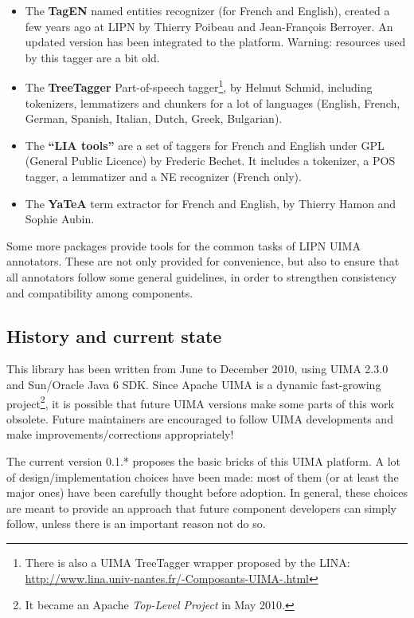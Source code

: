 \documentclass{article}
\newenvironment{xitemize}{
\begin{itemize}
  \setlength{\itemsep}{.3\baselineskip}
  \setlength{\topsep}{0pt}
  \setlength{\parskip}{0pt}
  \setlength{\parsep}{0pt}
}{\end{itemize}}
\begin{document}
\begin{xitemize}
\item The {\bf TagEN} named entities recognizer (for French and English), created a few years ago at LIPN by Thierry Poibeau and Jean-François Berroyer. An updated version has been integrated to the platform. Warning: resources used by this tagger are a bit old.
\item The {\bf TreeTagger} Part-of-speech tagger\footnote{There is also a UIMA TreeTagger wrapper proposed by the LINA: \url{http://www.lina.univ-nantes.fr/-Composants-UIMA-.html}}, by Helmut Schmid, including tokenizers, lemmatizers and chunkers for a lot of languages (English, French, German, Spanish, Italian, Dutch, Greek, Bulgarian).  
\item The {\bf ``LIA tools''} are a set of taggers for French and English under GPL (General Public Licence) by Frederic Bechet. It includes a tokenizer, a POS tagger, a lemmatizer and a NE recognizer (French only). 
\item The {\bf YaTeA} term extractor for French and English, by Thierry Hamon and Sophie Aubin.

\end{xitemize}

Some more packages provide tools for the common tasks of LIPN UIMA annotators. These are not only provided for convenience, but also to ensure that all annotators follow some general guidelines, in order to strengthen consistency and compatibility among components.



\subsection{History and current state}

This library has been written from June to December 2010, using UIMA 2.3.0 and Sun/Oracle Java 6 SDK. Since Apache UIMA is a dynamic fast-growing project\footnote{It became an Apache {\em Top-Level Project} in May 2010.}, it is possible that future UIMA versions make some parts of this work obsolete. Future maintainers are encouraged to follow UIMA developments and make improvements/corrections appropriately!

The current version 0.1.* proposes the basic bricks of this UIMA platform. A lot of design/implementation choices have been made: most of them (or at least the major ones) have been carefully thought before adoption. In general, these choices are meant to provide an approach that future component developers can simply follow, unless there is an important  reason not do so.
\end{document}
